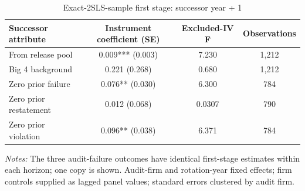\begin{table}[htbp]
\footnotesize
\centering
\caption{Exact-2SLS-sample first stage: successor year + 1}
\begin{threeparttable}
\begin{tabular}{p{}ccc}
\toprule
Successor attribute & Instrument coefficient (SE) & Excluded-IV F & Observations \\
\midrule
From release pool & 0.009*** (0.003) & 7.230 & 1,212 \\
Big 4 background & 0.221 (0.268) & 0.680 & 1,212 \\
Zero prior failure & 0.076** (0.030) & 6.300 & 784 \\
Zero prior restatement & 0.012 (0.068) & 0.0307 & 790 \\
Zero prior violation & 0.096** (0.038) & 6.371 & 784 \\
\bottomrule
\end{tabular}
\begin{tablenotes}\footnotesize
\item \raggedright \textit{Notes:} The three audit-failure outcomes have identical first-stage estimates within each horizon; one copy is shown. Audit-firm and rotation-year fixed effects; firm controls supplied as lagged panel values; standard errors clustered by audit firm.
\end{tablenotes}
\end{threeparttable}
\end{table}

